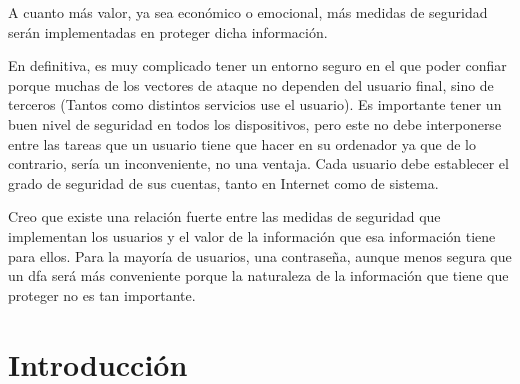 \documentclass[titlepage, 12pt, a4paper]{article}
\begin{document}
A cuanto más valor, ya sea económico o emocional, más medidas de seguridad serán implementadas en proteger dicha información.\par En definitiva, es muy complicado tener un entorno seguro en el que poder confiar porque muchas de los vectores de ataque no dependen del usuario final, sino de terceros (Tantos como distintos servicios use el usuario). Es importante tener un buen nivel de seguridad en todos los dispositivos, pero este no debe interponerse entre las tareas que un usuario tiene que hacer en su ordenador ya que de lo contrario, sería un inconveniente, no una ventaja. Cada usuario debe establecer el grado de seguridad de sus cuentas, tanto en Internet como de sistema.\par Creo que existe una relación fuerte entre las medidas de seguridad que implementan los usuarios y el valor de la información que esa información tiene para ellos. Para la mayoría de usuarios, una contraseña, aunque menos segura que un \Gls{dfa} será más conveniente porque la naturaleza de la información que tiene que proteger no es tan importante.
\section{Introducción}
\end{document}
